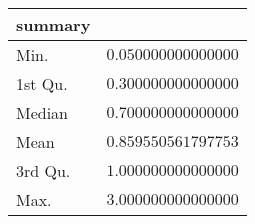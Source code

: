 \begin{table}[!tbp]
\begin{center}
\begin{tabular}{lr}
\hline\hline
\multicolumn{1}{l}{summary}&\multicolumn{1}{c}{}\tabularnewline
\hline
Min.&$0.050000000000000$\tabularnewline
1st Qu.&$0.300000000000000$\tabularnewline
Median&$0.700000000000000$\tabularnewline
Mean&$0.859550561797753$\tabularnewline
3rd Qu.&$1.000000000000000$\tabularnewline
Max.&$3.000000000000000$\tabularnewline
\hline
\end{tabular}\end{center}
\end{table}
